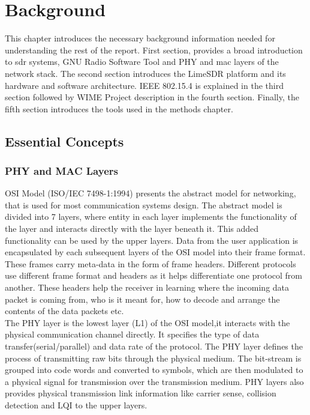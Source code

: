 \chapter{Background}
This chapter introduces the necessary background information needed for understanding the rest of the report.
First section, provides a broad introduction to \ac{sdr} systems, GNU Radio Software Tool and \ac{PHY} and \ac{mac} layers of the network stack.
The second section introduces the LimeSDR platform and its hardware and software architecture.
IEEE 802.15.4 is explained in the third section followed by WIME Project description in the fourth section.
Finally, the fifth section introduces the tools used in the methods chapter.


\section{Essential Concepts}
\subsection{PHY and MAC Layers}
\ac{OSI} Model (ISO/IEC 7498-1:1994)\cite{noauthor_iso/iec_nodate} presents the abstract model for networking, that is used for most communication systems design.
The abstract model is divided into 7 layers,  where entity in each layer implements the functionality of the layer and interacts directly with the layer beneath it.
This added functionality can be used by the upper layers.
Data from the user application is encapsulated by each subsequent layers of the \ac{OSI} model into their frame format.
These frames carry meta-data in the form of frame headers.
Different protocols use different frame format and headers  as it helps differentiate one protocol from another.
These headers help the receiver in learning where the incoming data packet is coming from, who is it meant for, how to decode and arrange the contents of the data packets etc.\\

The \ac{PHY} layer is the lowest layer (L1) of the \ac{OSI} model,it interacts with the physical communication channel directly.
It specifies the type of data transfer(serial/parallel) and data rate of the protocol.
The \ac{PHY} layer defines the process of transmitting raw bits through the physical medium.
The bit-stream is grouped into code words and converted to symbols, which are then modulated to a physical signal for transmission over the transmission medium.
\ac{PHY} layers also provides physical transmission link information like carrier sense, collision detection and \ac{LQI}  to the upper layers. \\


